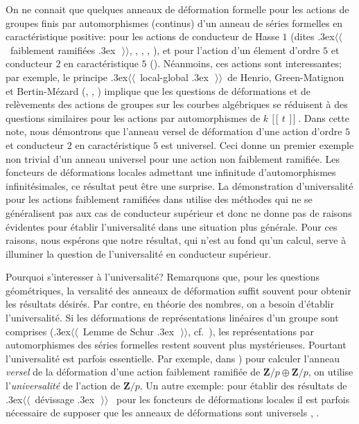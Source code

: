 \documentclass[11pt]{amsart}
\DeclareMathOperator{\psl}{\![\![\!}
\DeclareMathOperator{\psr}{\!]\!]}
\def\og{\leavevmode\raise.3ex\hbox{$\scriptscriptstyle\langle\!\langle$~}}
\def\fg{\leavevmode\raise.3ex\hbox{~$\!\scriptscriptstyle\,\rangle\!\rangle$}}
\begin{document}
On ne connait que quelques anneaux de d\'eformation formelle pour les actions de groupes finis par automorphismes (continus) d'un anneau de s\'eries formelles en caract\'eristique positive: pour les actions de conducteur de Hasse $1$ (dites \og faiblement ramifi\'ees \fg , \cite{BM}, \cite{CK}, \cite{CM}, \cite{BC}), et pour l'action d'un \'element d'ordre $5$ et conducteur $2$ en caract\'eristique $5$ (\cite{BM}). N\'eanmoins, ces actions sont interessantes; par exemple,  le principe \og local-global \fg\,  de Henrio, Green-Matignon et Bertin-M\'ezard (\cite{Henrio}, \cite{GM}, \cite{BM}) implique que les questions de d\'eformations et de rel\`evements des actions de groupes sur les courbes alg\'ebriques se r\'eduisent \`a des questions similaires pour les actions par automorphismes de $k\psl t \psr$. Dans cette note, nous d\'emontrons que l'anneau versel de d\'eformation d'une action d'ordre $5$ et conducteur $2$ en caract\'eristique $5$ est universel. Ceci donne un premier exemple non trivial d'un anneau universel pour une action non faiblement ramifi\'ee. Les foncteurs de d\'eformations locales admettant une infinitude d'automorphismes infinit\'esimales, ce r\'esultat peut \^etre une surprise. La d\'emonstration d'universalit\'e pour les actions faiblement ramifi\'ees dans \cite{BC} utilise des m\'ethodes qui ne se g\'en\'eralisent pas aux cas de conducteur sup\'erieur et donc  ne donne pas de  raisons \'evidentes pour \'etablir l'universalit\'e dans une situation plus g\'en\'erale. Pour ces raisons, nous  esp\'erons que notre r\'esultat, qui n'est au fond qu'un calcul, serve \`a illuminer la question de l'universalit\'e en conducteur sup\'erieur.

Pourquoi s'interesser \`a l'universalit\'e? Remarquons que, pour les questions g\'eom\'etriques, la versalit\'e des anneaux de d\'eformation suffit souvent pour obtenir les r\'esultats d\'esir\'es. Par contre, en th\'eorie des nombres, on a besoin d'\'etablir l'universalit\'e. Si les d\'eformations de repr\'esentations lin\'eaires d'un groupe sont comprises (\og Lemme de Schur \fg , cf.\ \cite{Mazur}), les repr\'e\-sen\-ta\-tions par automorphismes des s\'eries formelles restent souvent plus myst\'erieuses. Pourtant  l'universalit\'e est parfois essentielle.  Par exemple, dans  \cite[Remark 3.3]{BC})  pour calculer l'anneau \emph{versel} de la d\'eformation d'une action faiblement ramifi\'ee de $\mathbf{Z}/p \oplus \mathbf{Z}/p$, on utilise l'\emph{universalit\'e} de l'action de $\mathbf{Z}/p$. Un autre exemple: pour \'etablir des r\'esultats de \og d\'evissage \fg \mbox{ } pour les foncteurs de d\'eformations locales il est parfois n\'ecessaire de supposer que les anneaux de d\'eformations sont universels \cite[Theorem 6.4.7]{Bthese}, \cite{B}. 
\end{document}
